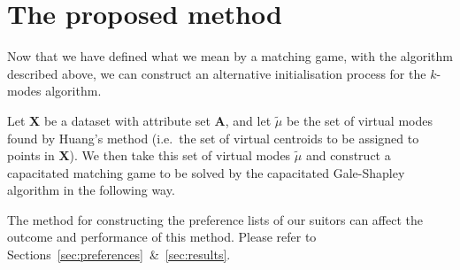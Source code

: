\section{The proposed method}\label{sec:proposed-method}

Now that we have defined what we mean by a matching game, with the algorithm 
described above, we can construct an alternative initialisation process for the 
\(k\)-modes algorithm.

Let \textbf{X} be a dataset with attribute set \textbf{A}, and let
\(\tilde{\mu}\) be the set of virtual modes found by Huang's method (i.e.\ the
set of virtual centroids to be assigned to points in \textbf{X}). We then take
this set of virtual modes \(\tilde{\mu}\) and construct a capacitated matching
game to be solved by the capacitated Gale-Shapley algorithm in the following
way.



\begin{remark}
    The method for constructing the preference lists of our suitors can affect
    the outcome and performance of this method. Please refer to
    Sections~\ref{sec:preferences}~\&~\ref{sec:results}.
\end{remark}
